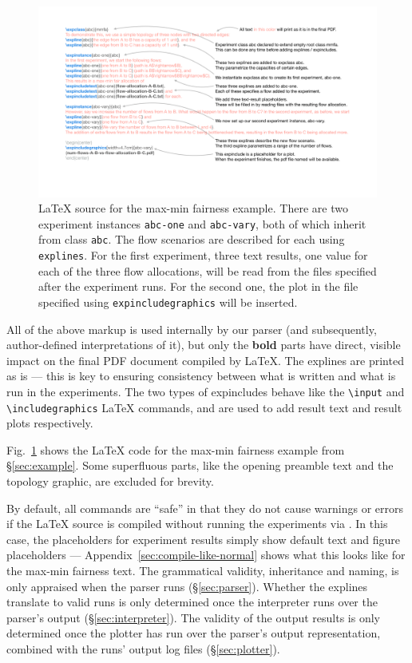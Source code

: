 \begin{figure}
    \centering
    \includegraphics[width=\textwidth]{figures/markup-example.pdf}
    \caption{\LaTeX{} source for the max-min fairness example. There are two experiment instances \texttt{abc-one} and \texttt{abc-vary}, both of which inherit from class \texttt{abc}. The flow scenarios are described for each using \texttt{explines}. For the first experiment, three text results, one value for each of the three flow allocations, will be read from the files specified after the experiment runs. For the second one, the plot in the file specified using \texttt{expincludegraphics} will be inserted.}
    \label{fig:example-latex}
    \vspace{-6pt}
\end{figure}

\noindent All of the above markup is used internally by our \experimentex parser (and subsequently, author-defined interpretations of it), but only the \textbf{bold} parts have direct, visible impact on the final PDF document compiled by \LaTeX{}. The explines are printed as is --- this is key to ensuring consistency between what is written and what is run in the experiments. The two types of expincludes behave like the \texttt{\textbackslash{}input} and \texttt{\textbackslash{}includegraphics} \LaTeX{} commands, and are used to add result text and result plots respectively.

Fig.~\ref{fig:example-latex} shows the \LaTeX{} code for the max-min fairness example from \S\ref{sec:example}. Some superfluous parts, like the opening preamble text and the topology graphic, are excluded for brevity.

By default, all \experimentex commands are ``safe'' in that they do not cause warnings or errors if the \LaTeX{} source is compiled without running the experiments via \sysname. In this case, the placeholders for experiment results simply show default text and figure placeholders --- Appendix~\ref{sec:compile-like-normal} shows what this looks like for the max-min fairness text. The grammatical validity, \eg inheritance and naming, is only appraised when the \experimentex parser runs (\S\ref{sec:parser}). Whether the explines translate to valid runs is only determined once the interpreter runs over the parser's output (\S\ref{sec:interpreter}). The validity of the output results is only determined once the plotter has run over the parser's output representation, combined with the runs' output log files (\S\ref{sec:plotter}).

